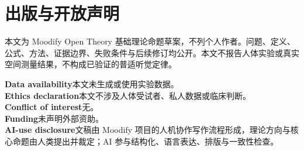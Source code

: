 \documentclass[10pt,a4paper]{article}
\begin{document}
\section*{出版与开放声明}
本文为 Moodify Open Theory 基础理论命题草案，不列个人作者。问题、定义、公式、方法、证据边界、失败条件与后续修订均公开。本文不报告人体实验或真实空间测量结果，不构成已验证的普适听觉定律。

\textbf{Data availability}\quad 本文未生成或使用实验数据。\\
\textbf{Ethics declaration}\quad 本文不涉及人体受试者、私人数据或临床判断。\\
\textbf{Conflict of interest}\quad 无。\\
\textbf{Funding}\quad 未声明外部资助。\\
\textbf{AI-use disclosure}\quad 文稿由 Moodify 项目的人机协作写作流程形成，理论方向与核心命题由人类提出并裁定；AI 参与结构化、语言表达、排版与一致性检查。
\end{document}
